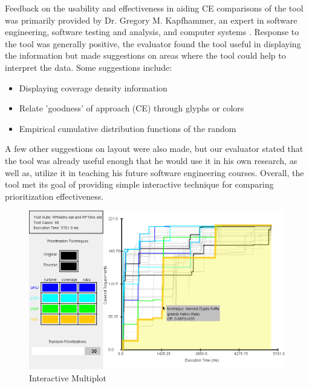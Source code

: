 \documentclass{vgtc}                          %
\begin{document}
Feedback on the usability and effectiveness in aiding CE comparisons of the tool was primarily provided by Dr. Gregory M. Kapfhammer, an expert in software engineering, software testing and analysis, and computer systems \cite{thehammer}.  Response to the tool was generally positive, the evaluator found the tool useful in displaying the information but made suggestions on areas where the tool could help to interpret the data.  Some suggestions include:
\begin{itemize}
 \item Displaying coverage density information
 \item Relate 'goodness' of approach (CE) through glyphs or colors
 \item Empirical cumulative distribution functions of the random
\end{itemize}
A few other suggestions on layout were also made, but our evaluator stated that the tool was already useful enough that he would use it in his own research, as well as, utilize it in teaching his future software engineering courses.  Overall, the tool met its goal of providing simple interactive technique for comparing prioritization effectiveness.

\begin{figure}
\includegraphics[scale=.25]{screenshot}
\caption{Interactive Multiplot}
\label{fig:screenshot}
\end{figure}




\end{document}
